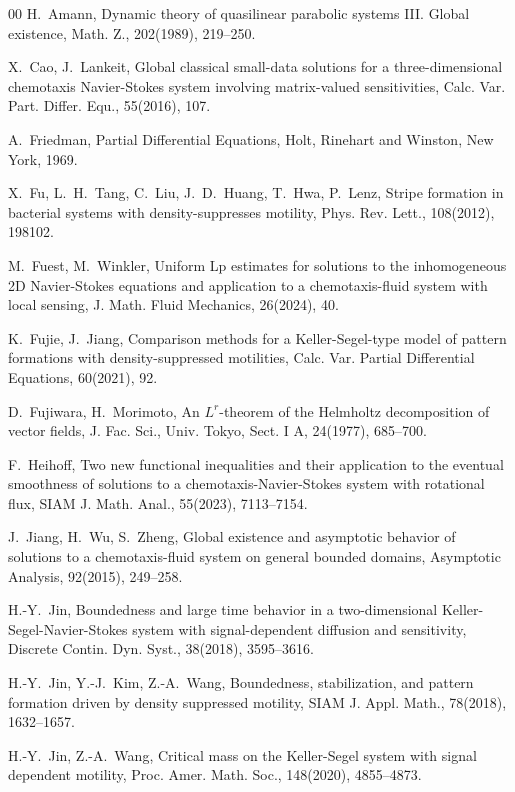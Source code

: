 \documentclass[12pt]{article}
\theoremstyle{plain}
\theoremstyle{definition}
\numberwithin{equation}{section}
\begin{document}
\begin{thebibliography}{00}
 H.~Amann, Dynamic theory of quasilinear parabolic systems III. Global existence, Math. Z., 202(1989), 219--250.

X.~Cao, J.~Lankeit,  Global classical small-data solutions for a three-dimensional chemotaxis Navier-Stokes system involving matrix-valued sensitivities, Calc. Var. Part. Differ. Equ., 55(2016), 107.

 A.~Friedman,
 Partial Differential Equations, Holt, Rinehart and Winston, New York, 1969.

 X.~Fu, L.~H.~Tang, C.~Liu, J.~D.~Huang, T.~Hwa, P.~Lenz, Stripe formation in bacterial systems with density-suppresses motility,
  Phys. Rev. Lett., 108(2012), 198102.

M.~Fuest, M.~Winkler,
Uniform Lp estimates for solutions to the inhomogeneous 2D Navier-Stokes equations and application to a chemotaxis-fluid
system with local sensing,  J. Math. Fluid Mechanics, 26(2024), 40.

 K.~Fujie, J.~Jiang, Comparison methods for a Keller-Segel-type model of pattern formations with density-suppressed motilities, Calc. Var. Partial Differential Equations, 60(2021), 92.

D.~Fujiwara,  H.~Morimoto,
 An $L^r$-theorem of the Helmholtz decomposition of vector fields,  J. Fac.
Sci., Univ. Tokyo, Sect. I A,  24(1977), 685--700.

F.~Heihoff,
Two new functional inequalities and their application to the
eventual smoothness of solutions to a chemotaxis-Navier-Stokes system with rotational flux, SIAM J. Math. Anal., 55(2023), 7113--7154.

J.~Jiang, H.~Wu, S.~Zheng,
Global existence and asymptotic behavior of solutions to a chemotaxis-fluid system on general bounded domains,
Asymptotic Analysis, 92(2015), 249--258.

H.-Y.~Jin,
Boundedness and large time behavior in a two-dimensional Keller-Segel-Navier-Stokes system
with signal-dependent diffusion and sensitivity, Discrete Contin. Dyn. Syst., 38(2018), 3595--3616.

H.-Y.~Jin, Y.-J.~Kim, Z.-A.~Wang, Boundedness, stabilization, and pattern formation driven by density suppressed motility,
SIAM J. Appl. Math., 78(2018), 1632--1657.

 H.-Y.~Jin, Z.-A.~Wang, Critical mass on the Keller-Segel system with signal dependent motility, Proc. Amer. Math. Soc.,
 148(2020), 4855--4873.


\end{thebibliography}
\end{document}
